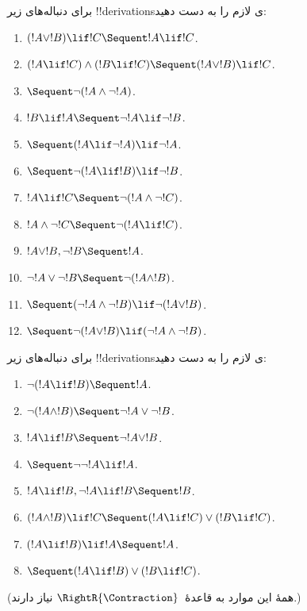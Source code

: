 \documentclass[../../../include/open-logic-section]{subfiles}
\begin{document}
\begin{prob}
برای دنباله‌های زیر !!{derivation}sی لازم را به دست دهید:
\begin{enumerate}
\item $(!A \lor !B) \lif !C \Sequent !A \lif !C$.
\item $(!A \lif !C) \land (!B \lif !C) \Sequent (!A \lor !B) \lif !C$.
\item $\Sequent \lnot(!A \land \lnot !A)$.
\item $!B \lif !A \Sequent \lnot !A \lif \lnot !B$.
\item $\Sequent (!A \lif \lnot !A) \lif \lnot !A$.
\item $\Sequent \lnot(!A \lif !B) \lif \lnot !B$.
\item $!A \lif !C \Sequent \lnot (!A \land \lnot !C)$.
\item $!A \land \lnot !C \Sequent \lnot (!A \lif !C)$.
\item $!A \lor !B, \lnot !B \Sequent !A$.
\item $\lnot !A \lor \lnot !B \Sequent \lnot(!A \land !B)$.
\item $\Sequent (\lnot !A \land \lnot !B) \lif\lnot(!A \lor !B)$.
\item $\Sequent \lnot(!A \lor !B) \lif (\lnot !A \land \lnot !B)$.
\end{enumerate}
\end{prob}

\begin{prob}
برای دنباله‌های زیر !!{derivation}sی لازم را به دست دهید:
\begin{enumerate}
\item $\lnot(!A \lif !B) \Sequent !A$.
\item $\lnot(!A \land !B) \Sequent \lnot !A \lor \lnot !B$.
\item $!A \lif !B \Sequent \lnot !A \lor !B$.
\item $\Sequent \lnot \lnot !A \lif !A$.
\item $!A \lif !B, \lnot !A \lif !B \Sequent !B$.
\item $(!A \land !B) \lif !C \Sequent (!A \lif !C) \lor (!B \lif !C)$.
\item $(!A \lif !B) \lif !A \Sequent !A$.
\item $\Sequent (!A \lif !B) \lor (!B \lif !C)$.
\end{enumerate}
(همهٔ این موارد به قاعدهٔ~$\RightR{\Contraction}$ نیاز دارند.)
\end{prob}
\end{document}
